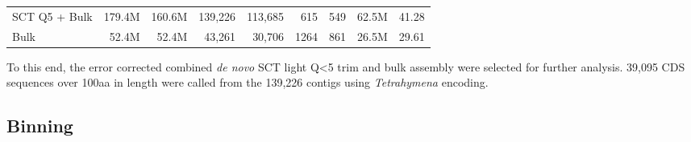 \begin{table}[h]
\begin{tabular}{|l|rrrrrrrl}
SCT Q5 + Bulk                  & 179.4M                                  & 160.6M                                                                                              & 139,226                                & 113,685                                & 615                             & 549                                     & 62.5M                                             & 41.28                     \\ \cline{1-1}
Bulk                           & 52.4M                                   & 52.4M                                                                                               & 43,261                                 & 30,706                                 & 1264                            & 861                                     & 26.5M                                             & 29.61                     \\ \cline{1-1}
\end{tabular}
\end{table}






To this end, the error corrected combined \textit{de novo} SCT light Q<5 trim and bulk assembly were selected for further analysis.
39,095 CDS sequences over 100aa in length were called from the 139,226 contigs using \textit{Tetrahymena} encoding.

\subsection{Binning}



